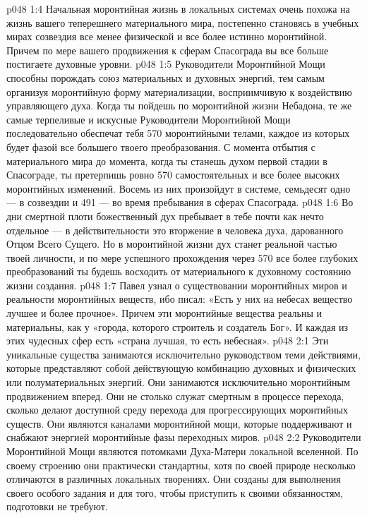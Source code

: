 \vs p048 1:4 \pc Начальная моронтийная жизнь в локальных системах очень похожа на жизнь вашего теперешнего материального мира, постепенно становясь в учебных мирах созвездия все менее физической и все более истинно моронтийной. Причем по мере вашего продвижения к сферам Спасограда вы все больше постигаете духовные уровни.
\vs p048 1:5 Руководители Моронтийной Мощи способны порождать союз материальных и духовных энергий, тем самым организуя моронтийную форму материализации, восприимчивую к воздействию управляющего духа. Когда ты пойдешь по моронтийной жизни Небадона, те же самые терпеливые и искусные Руководители Моронтийной Мощи последовательно обеспечат тебя 570 моронтийными телами, каждое из которых будет фазой все большего твоего преобразования. С момента отбытия с материального мира до момента, когда ты станешь духом первой стадии в Спасограде, ты претерпишь ровно 570 самостоятельных и все более высоких моронтийных изменений. Восемь из них произойдут в системе, семьдесят одно --- в созвездии и 491 --- во время пребывания в сферах Спасограда.
\vs p048 1:6 Во дни смертной плоти божественный дух пребывает в тебе почти как нечто отдельное --- в действительности это вторжение в человека духа, дарованного Отцом Всего Сущего. Но в моронтийной жизни дух станет реальной частью твоей личности, и по мере успешного прохождения через 570 все более глубоких преобразований ты будешь восходить от материального к духовному состоянию жизни создания.
\vs p048 1:7 \pc Павел узнал о существовании моронтийных миров и реальности моронтийных веществ, ибо писал: «Есть у них на небесах вещество лучшее и более прочное». Причем эти моронтийные вещества реальны и материальны, как у «города, которого строитель и создатель Бог». И каждая из этих чудесных сфер есть «страна лучшая, то есть небесная».
\vs p048 2:1 Эти уникальные существа занимаются исключительно руководством теми действиями, которые представляют собой действующую комбинацию духовных и физических или полуматериальных энергий. Они занимаются исключительно моронтийным продвижением вперед. Они не столько служат смертным в процессе перехода, сколько делают доступной среду перехода для прогрессирующих моронтийных существ. Они являются каналами моронтийной мощи, которые поддерживают и снабжают энергией моронтийные фазы переходных миров.
\vs p048 2:2 Руководители Моронтийной Мощи являются потомками Духа\hyp{}Матери локальной вселенной. По своему строению они практически стандартны, хотя по своей природе несколько отличаются в различных локальных творениях. Они созданы для выполнения своего особого задания и для того, чтобы приступить к своими обязанностям, подготовки не требуют.
